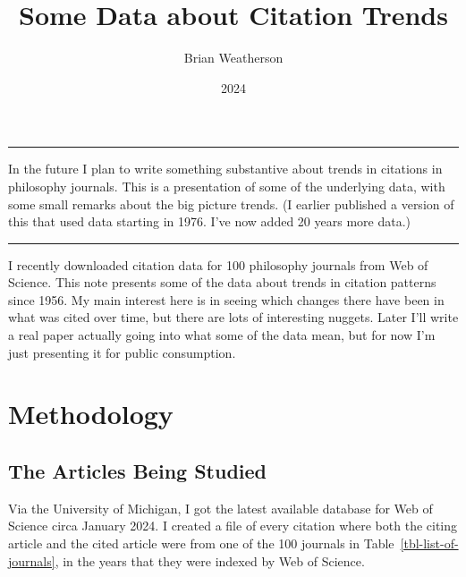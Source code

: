 \documentclass[
  10pt,
  letterpaper,
  DIV=11,
  numbers=noendperiod,
  twoside]{scrartcl}
\title{Some Data about Citation Trends}
\author{Brian Weatherson}
\date{2024}
\renewenvironment{abstract}
 {\vspace{-1.25cm}
 \quotation\small\noindent\rule{\linewidth}{.5pt}\par\smallskip
 \noindent }
 {\par\noindent\rule{\linewidth}{.5pt}\endquotation}
\begin{document}
\maketitle
\begin{abstract}
In the future I plan to write something substantive about trends in
citations in philosophy journals. This is a presentation of some of the
underlying data, with some small remarks about the big picture trends.
(I earlier published a version of this that used data starting in 1976.
I've now added 20 years more data.)
\end{abstract}

I recently downloaded citation data for 100 philosophy journals from Web
of Science. This note presents some of the data about trends in citation
patterns since 1956. My main interest here is in seeing which changes
there have been in what was cited over time, but there are lots of
interesting nuggets. Later I'll write a real paper actually going into
what some of the data mean, but for now I'm just presenting it for
public consumption.

\section{Methodology}\label{sec-methodology}

\subsection{The Articles Being Studied}\label{sec-articles-studied}

Via the University of Michigan, I got the latest available database for
Web of Science circa January 2024. I created a file of every citation
where both the citing article and the cited article were from one of the
100 journals in Table~\ref{tbl-list-of-journals}, in the years that they
were indexed by Web of Science.
\end{document}
